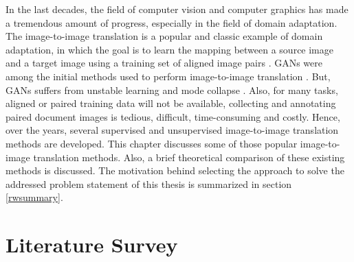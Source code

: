 
\justifying
\setlength{\parskip}{1em}


In the last decades, the field of computer vision and computer graphics has made a tremendous amount of progress, especially in the field of domain adaptation. The image-to-image translation is a popular and classic example of domain adaptation, in which the goal is to learn the mapping between a source image and a target image using a training set of aligned image pairs \cite{mirza2014conditional}. \acp{GAN} were among the initial methods used to perform image-to-image translation \cite{pang2021imagetoimage} \cite{goodfellow2014generative}. But, \acp{GAN} suffers from unstable learning and mode collapse \cite{thanhtung2020catastrophic}. Also, for many tasks, aligned or paired training data will not be available, collecting and annotating paired document images is tedious, difficult, time-consuming and costly. Hence, over the years, several supervised and unsupervised image-to-image translation methods are developed. This chapter discusses some of those popular image-to-image translation methods. Also, a brief theoretical comparison of these existing methods is discussed. The motivation behind selecting the approach to solve the addressed problem statement of this thesis is summarized in section \ref{rwsummary}.



\section{Literature Survey}\label{LiteratureSurvey}


